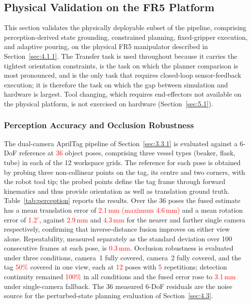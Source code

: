\documentclass{ieeeaccess}
\newif\ifhighlight
\newcommand{\rev}[1]{\ifhighlight\hl{#1}\else#1\fi}
\newcommand{\nd}[1]{\textcolor{red}{#1}}
\begin{document}
\subsection{Physical Validation on the FR5 Platform}\label{sec:4.6}
\rev{This section validates the physically deployable subset of the pipeline, comprising perception-derived state grounding, constrained planning, fixed-gripper execution, and adaptive pouring, on the physical FR5 manipulator described in Section~\ref{sec:4.1.1}.
The Transfer task is used throughout because it carries the tightest orientation constraints, is the task on which the planner comparison is most pronounced, and is the only task that requires closed-loop sensor-feedback execution; it is therefore the task on which the gap between simulation and hardware is largest.
Tool changing, which requires end-effectors not available on the physical platform, is not exercised on hardware (Section~\ref{sec:5.1}).}

\subsubsection{Perception Accuracy and Occlusion Robustness}\label{sec:4.6.1}
\rev{The dual-camera AprilTag pipeline of Section~\ref{sec:3.3.1} is evaluated against a 6-DoF reference at \nd{36} object poses, comprising three vessel types (beaker, flask, tube) in each of the 12 workspace grids.
The reference for each pose is obtained by probing three non-collinear points on the tag, its centre and two corners, with the robot tool tip; the probed points define the tag frame through forward kinematics and thus provide orientation as well as translation ground truth.
Table~\ref{tab:perception} reports the results.
Over the 36 poses the fused estimate has a mean translation error of \nd{2.1\,mm (maximum 4.6\,mm)} and a mean rotation error of \nd{1.2$^\circ$}, against \nd{2.9\,mm} and \nd{4.3\,mm} for the nearer and farther single camera respectively, confirming that inverse-distance fusion improves on either view alone.
Repeatability, measured separately as the standard deviation over 100 consecutive frames at each pose, is \nd{0.3\,mm}.
Occlusion robustness is evaluated under three conditions, camera~1 fully covered, camera~2 fully covered, and the tag \nd{50\%} covered in one view, each at \nd{12} poses with \nd{5} repetitions; detection continuity remained \nd{100\%} in all conditions and the fused error rose to \nd{3.1\,mm} under single-camera fallback.
The 36 measured 6-DoF residuals are the noise source for the perturbed-state planning evaluation of Section~\ref{sec:4.3}.}
\end{document}
